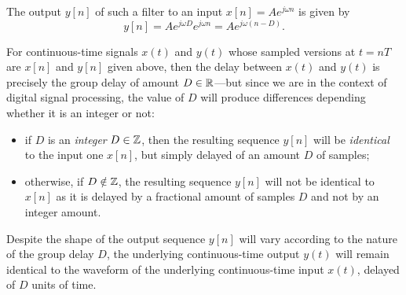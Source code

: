 \documentclass[\documentfontsize, twocolumn]{\classname}
\begin{document}
\begin{center}

\end{center}

The output $y[n]$ of such a filter to an input $x[n]=Ae^{j\omega n}$ is given by
\begin{equation}\label{eqn:linearPhaseTransferFunctionOutput}
    y[n] = Ae^{j\omega D} e^{j\omega n} = Ae^{j\omega(n - D)}.
\end{equation}

For continuous-time signals $x(t)$ and $y(t)$ whose sampled versions at $t = nT$ are $x[n]$ and $y[n]$ given above, then the delay between $x(t)$ and $y(t)$ is precisely the group delay of amount $D \in \mathbb R$---but since we are in the context of digital signal processing, the value of $D$ will produce differences depending whether it is an integer or not:
\begin{itemize}
    \item if $D$ is an \emph{integer} $D \in \mathbb Z$, then the resulting sequence $y[n]$ will be \emph{identical} to the input one $x[n]$, but simply delayed of an amount $D$ of samples;
    \item otherwise, if $D \notin \mathbb Z$, the resulting sequence $y[n]$ will not be identical to $x[n]$ as it is delayed by a fractional amount of samples $D$ and not by an integer amount.
\end{itemize}
Despite the shape of the output sequence $y[n]$ will vary according to the nature of the group delay $D$, the underlying continuous-time output $y(t)$ will remain identical to the waveform of the underlying continuous-time input $x(t)$, delayed of $D$ units of time.
\end{document}
